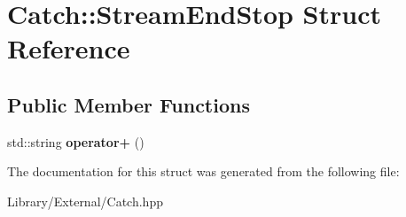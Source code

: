 \hypertarget{struct_catch_1_1_stream_end_stop}{}\section{Catch\+:\+:Stream\+End\+Stop Struct Reference}
\label{struct_catch_1_1_stream_end_stop}
\subsection*{Public Member Functions}
\begin{DoxyCompactItemize}
\item 
\hypertarget{struct_catch_1_1_stream_end_stop_a3025092e06c224e0845f2caa07b26d0e}{}std\+::string {\bfseries operator+} ()\label{struct_catch_1_1_stream_end_stop_a3025092e06c224e0845f2caa07b26d0e}

\end{DoxyCompactItemize}


The documentation for this struct was generated from the following file\+:\begin{DoxyCompactItemize}
\item 
Library/\+External/Catch.\+hpp\end{DoxyCompactItemize}
